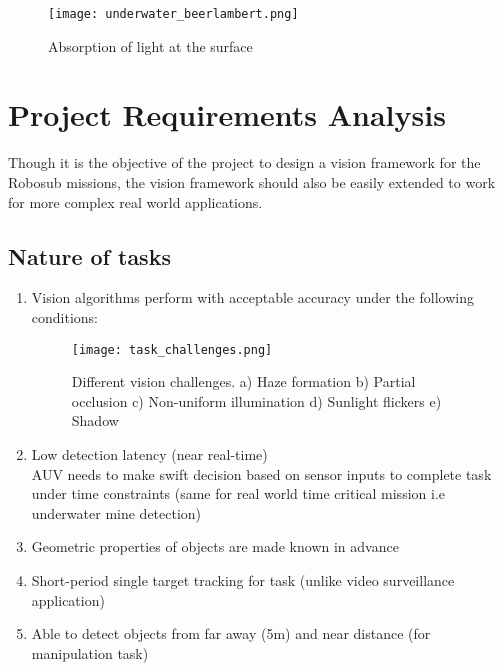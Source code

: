 \begin{figure}[ht]
\centering

        \texttt{[image: underwater\_beerlambert.png]}
        \caption{Absorption of light at the surface}
        \label{fig:water_surface_effect}

\end{figure}

\section{Project Requirements Analysis}
Though it is the objective of the project to design a vision framework for the Robosub missions, the vision framework should also be easily extended to work for more complex real world applications. 

\subsection{Nature of tasks}
\begin{enumerate}
    \item Vision algorithms perform with acceptable accuracy under the following conditions:
    \begin{figure}[ht]
    \centering
            \texttt{[image: task\_challenges.png]}
            \caption{Different vision challenges. a) Haze formation b) Partial occlusion c) Non-uniform illumination d) Sunlight flickers e) Shadow}
            \label{fig:vision_challenges}
    \end{figure}
    \item Low detection latency (near real-time) \\
        AUV needs to make swift decision based on sensor inputs to complete task under time constraints (same for real world time critical mission i.e underwater mine detection)
    \item Geometric properties of objects are made known in advance
    \item Short-period single target tracking for  task (unlike video surveillance application)
    \item Able to detect objects from far away (5m) and near distance (for manipulation task)
\end{enumerate}